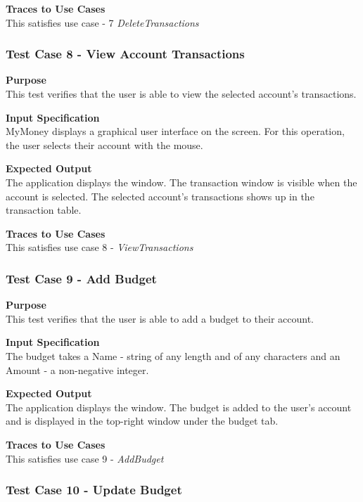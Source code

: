 \documentclass[12pt]{article}
\begin{document}
\noindent
{\bf Traces to Use Cases}\\
This satisfies use case  - 7 \textit{DeleteTransactions}

\subsubsection{Test Case 8 - View Account Transactions} \label{TC-8}
\noindent
{\bf Purpose}\\
This test verifies that the user is able to view the selected account's transactions.
                                                        
\noindent
{\bf Input Specification}\\
MyMoney displays a graphical user interface on the screen.
For this operation, the user selects their account with the mouse.

\noindent
{\bf Expected Output}\\
The application displays the window.       
The transaction window is visible when the account is selected.
The selected account's transactions shows up in the transaction table. 

\noindent
{\bf Traces to Use Cases}\\
This satisfies use case 8 - \textit{ViewTransactions}

\subsubsection{Test Case 9 - Add Budget} \label{TC-9}
\noindent
{\bf Purpose}\\
This test verifies that the user is able to add a budget to their account.

{\bf Input Specification}\\
The budget takes a Name - string of any length and of any characters
and an Amount - a non-negative integer.

{\bf Expected Output}\\
The application displays the window.
The budget is added to the user's account and is displayed in the top-right window
under the budget tab.

\noindent
{\bf Traces to Use Cases}\\
This satisfies use case 9 - \textit{AddBudget}

\subsubsection{Test Case 10 - Update Budget} \label{TC-10}
\end{document}
